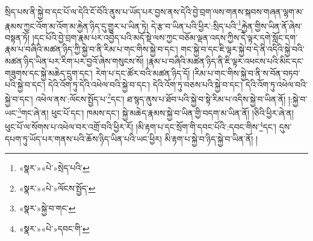 སྲིད་པས་ནི་སྐྱེ་བ་དང་པོ་ལ་དེའི་ངོ་བོའི་ནུས་པ་ཡོད་པར་བྱས་ནས་དེའི་བྱེ་བྲག་ལས་གནས་སྐབས་གཞན་ལྷག་མ་རྣམས་ཀྱང་འོག་མ་འོག་མ་རྐྱེན་ཉིད་དུ་གྱུར་པ་ཡིན་ཏེ། དེ་རྩ་བ་ཡིན་པའི་ཕྱིར་:སྲིད་པའི་\footnote{«སྣར་»«པེ་»སྲེད་པའི་}རྐྱེན་གྱིས་ཡིན་ནོ་ཞེས་བསྟན་ཏོ། །དང་པོའི་བྱེ་བྲག་རྣམ་པར་འབྱེད་པའི་མདོ་སྡེ་ལས་ཀྱང་བཅོམ་ལྡན་འདས་ཀྱིས་དེ་ལྟར་དགེ་སློང་དག་རྣམ་པ་བཞིའི་མཚན་ཉིད་ཀྱི་སྐྱེ་བ་ནི་རིམ་པ་གང་གིས་སྐྱེ་བ་དང་། གང་སྐྱེ་བ་དང་ཇི་ལྟར་སྐྱེ་བ་དེ་ནི་འདིའི་སྐྱེ་བའི་མཚན་ཉིད་ཡིན་པར་རིག་པར་བྱའོ་ཞེས་གསུངས་སོ། །རྣམ་པ་བཞིའི་མཚན་ཉིད་ནི་ཇི་ལྟར་འཕངས་པའི་མིང་དང་གཟུགས་དང་སྐྱེ་མཆེད་དྲུག་དང་། རེག་པ་དང་ཚོར་བའི་མཚན་ཉིད་དོ། །རིམ་པ་གང་གིས་སྐྱེ་བ་ནི་ས་བོན་བཏབ་པའི་སྐྱེ་བ་དང་། དེའི་འོག་ཏུ་དེའི་འཕེལ་བའི་སྐྱེ་བ་དང་། དེའི་འོག་ཏུ་བཅས་པའི་སྐྱེ་བ་དང་། དེའི་འོག་ཏུ་འཕེལ་བའི་སྐྱེ་བ་དང་། འཕེལ་ནས་:ལོངས་སྤྱོད་པ་\footnote{«སྣར་»«པེ་»ལོངས་སྤྱོད་}དང་། ཐ་སྙད་ནུས་པ་ཐོབ་པའི་སྐྱེ་བ་སྟེ་རིམ་པ་འདིས་སྐྱེ་བ་ཡིན་ནོ། །:སྐྱེ་བ་ཡང་\footnote{«སྣར་»སྐྱེ་བ་གང་}གང་ཞེ་ན། ཕུང་པོ་དང་། ཁམས་དང་། སྐྱེ་མཆེད་རྣམས་སྐྱེ་བ་ཡིན་གྱི་བདག་མ་ཡིན་ནོ། །ཅིའི་ཕྱིར་ཞེ་ན། ཕུང་པོ་ལ་སོགས་པ་འཕེལ་བར་འགྲོ་བའི་ཕྱིར་རོ། །མི་རྟག་པ་དང་སྲོག་གི་དབང་པོའི་:དབང་གིས་\footnote{«སྣར་»«པེ་»དབང་གི་}དང་། དུས་དཔག་ཏུ་ཡོད་པར་གནས་པའི་ཆོས་ཉིད་ཡིན་པའི་ཡང་ཕྱིར། མི་རྟག་པ་སྐྱེ་བ་ཉིད་སྐྱེ་བ་ཡིན་ནོ། །
